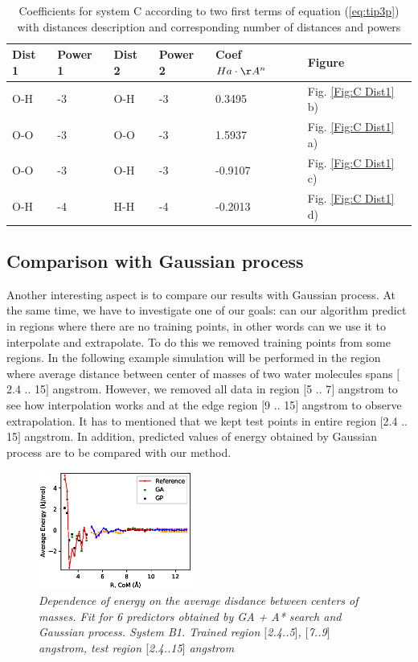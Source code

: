 \documentclass[aip,jcp,reprint,amsmath,amssymb,nature]{revtex4-1}
\begin{document}
\begin{table}[h]
\caption{Coefficients for system C according to two first terms of equation (\ref{eq:tip3p}) with distances description and corresponding number of distances and powers}
\label{Tab:C coefficients}
\begin{tabular}{|l|l|l|l|l|l|}
\hline
\textbf{Dist 1} & \textbf{Power 1} & \textbf{Dist 2} & \textbf{
Power 2} & \textbf{Coef $Ha\cdot\AA^n$} & \textbf{Figure} \\
\hline
O-H & -3 & O-H & -3 & 0.3495 & Fig. \ref{Fig:C Dist1} b) \\
\hline
O-O & -3 & O-O & -3 & 1.5937 & Fig. \ref{Fig:C Dist1} a) \\
\hline
O-O & -3 & O-H & -3 & -0.9107 & Fig. \ref{Fig:C Dist1} c) \\
\hline
O-H & -4 & H-H & -4 & -0.2013 & Fig. \ref{Fig:C Dist1} d) \\
\hline
\end{tabular}
\end{table}


\subsection{Comparison with Gaussian process}

Another interesting aspect is to compare our results with Gaussian 
process. At the same time, we have to investigate one of our goals: can 
our algorithm predict in regions where there are no training points, in 
other words can we use it to interpolate and extrapolate. To do this we 
removed training points from some regions. In the following example 
simulation will be performed in the region where average distance 
between center of masses of two water molecules spans $[$2.4 .. 15$]$ 
angstrom. However, we removed all data in region $[$5 .. 7$]$ angstrom 
to see how interpolation works and at the edge region $[$9 .. 15$]$ 
angstrom to observe extrapolation. It has to mentioned that we kept test 
points in entire region $[$2.4 .. 15$]$ angstrom. In addition, predicted 
values of energy obtained by Gaussian process are to be compared with 
our method. 

\begin{figure}[h]
\centering
\includegraphics[width=0.45\textwidth]{media/B1_gap_Energy_6_predictors.eps}
\caption{\textit{Dependence of energy on the average disdance between centers of masses. Fit for 6 predictors obtained by GA + A* search and Gaussian process. System B1. Trained region $[$2.4..5$]$, 
$[$7..9$]$ angstrom, test region $[$2.4..15$]$ angstrom}}
\label{Fig:B1_gap_energy_6_predictors}
\end{figure}
\end{document}
